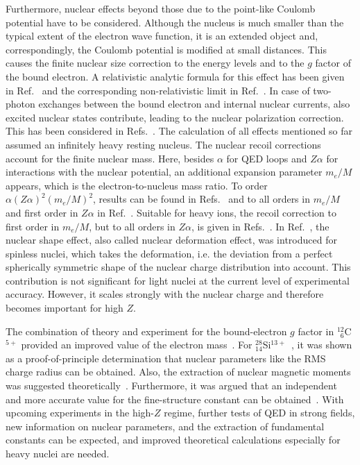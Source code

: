 Furthermore, nuclear effects beyond those due to the point-like Coulomb potential have to be considered. Although the nucleus is much smaller than the typical extent of the electron wave function, it is an extended object and, correspondingly, the Coulomb potential is modified at small distances. This causes the finite nuclear size correction to the energy levels and to the $g$ factor of the bound electron. A relativistic analytic formula for this effect has been given in Ref.~\cite{Glazov2002} and the corresponding non-relativistic limit in Ref.~\cite{karshenboim2000}. In case of two-photon exchanges between the bound electron and internal nuclear currents, also excited nuclear states contribute, leading to the nuclear polarization correction. This has been considered in Refs.~\cite{Nefiodov,volotka2014}. 
The calculation of all effects mentioned so far assumed an infinitely heavy resting nucleus. The nuclear recoil corrections account for the finite nuclear mass. Here, besides $\alpha$ for QED loops and $Z\alpha$ for interactions with the nuclear potential, an additional expansion parameter $m_e/M$ appears, which is the electron-to-nucleus mass ratio. To order $\alpha(Z\alpha)^2(m_e/M)^2$, results can be found in Refs.~\cite{eides2010} and to all orders in $m_e/M$ and first order in $Z\alpha$ in Ref.~\cite{pachucki2010}. Suitable for heavy ions, the recoil correction to first order in $m_e/M$, but to all orders in $Z\alpha$, is given in Refs.~\cite{shabaev2001,Shabaev2002}.
In Ref.~\cite{jacek2012}, the nuclear shape effect, also called nuclear deformation effect, was introduced for spinless nuclei, which takes the deformation, i.e. the deviation from a perfect spherically symmetric shape of the nuclear charge distribution into account. This contribution is not significant for light nuclei at the current level of experimental accuracy. However, it scales strongly with the nuclear charge and therefore becomes important for high $Z$. 

The combination of theory and experiment for the bound-electron $g$ factor in $^{12}_{\phantom{0}6}$C$^{5+}$ provided an improved value of the electron mass~\cite{Kohler2015,Sturm2014,Zatorski2017}. For $^{28}_{14}$Si$^{13+}$~\cite{Sturm2011}, it was shown as a proof-of-principle determination that nuclear parameters like the RMS charge radius can be obtained. Also, the extraction of nuclear magnetic moments was suggested theoretically~\cite{Yerokhin2011,Werth2001}. Furthermore, it was argued that an independent and more accurate value for the fine-structure constant can be obtained~\cite{Shabaev2006,yerokhin2016,Yerokhin2016PRA}. With upcoming experiments in the high-$Z$ regime, further tests of QED in strong fields, new information on nuclear parameters, and the extraction of fundamental constants can be expected, and improved theoretical calculations especially for heavy nuclei are needed.

